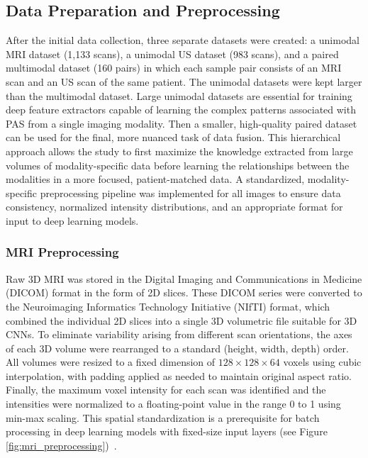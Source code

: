 \documentclass[12pt]{article}
\begin{document}
\subsection{Data Preparation and Preprocessing}

After the initial data collection, three separate datasets were created: a unimodal MRI dataset (1,133 scans), a unimodal US dataset (983 scans), and a paired multimodal dataset (160 pairs) in which each sample pair consists of an MRI scan and an US scan of the same patient. The unimodal datasets were kept larger than the multimodal dataset. Large unimodal datasets are essential for training deep feature extractors capable of learning the complex patterns associated with PAS from a single imaging modality. Then a smaller, high-quality paired dataset can be used for the final, more nuanced task of data fusion. This hierarchical approach allows the study to first maximize the knowledge extracted from large volumes of modality-specific data before learning the relationships between the modalities in a more focused, patient-matched data. A standardized, modality-specific preprocessing pipeline was implemented for all images to ensure data consistency, normalized intensity distributions, and an appropriate format for input to deep learning models.

\subsubsection{MRI Preprocessing}

Raw 3D MRI was stored in the Digital Imaging and Communications in Medicine (DICOM) format in the form of 2D slices. These DICOM series were converted to the Neuroimaging Informatics Technology Initiative (NIfTI) format, which combined the individual 2D slices into a single 3D volumetric file suitable for 3D CNNs. To eliminate variability arising from different scan orientations, the axes of each 3D volume were rearranged to a standard (height, width, depth) order. All volumes were resized to a fixed dimension of $128\times128\times64$ voxels using cubic interpolation, with padding applied as needed to maintain original aspect ratio. Finally, the maximum voxel intensity for each scan was identified and the intensities were normalized to a floating-point value in the range 0 to 1 using min-max scaling. This spatial standardization is a prerequisite for batch processing in deep learning models with fixed-size input layers (see Figure \ref{fig:mri_preprocessing})~\cite{Ali_2025}.
\end{document}
